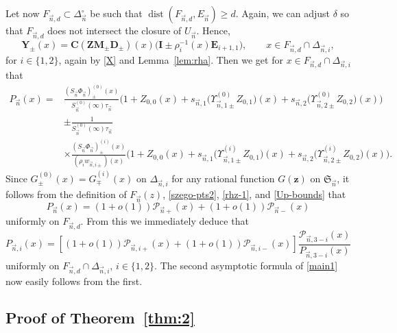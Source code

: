 \documentclass[pdftex]{sigma}
\numberwithin{equation}{section}
\newcommand{\dist}{\operatorname{dist}}
\newcommand{\n}{{\vec n}}
\newcommand{\RS}{\boldsymbol{\mathfrak{S}}}
\newcommand{\z}	{{\boldsymbol z}}
\begin{document}
Let now $ F_{\n,d} \subset\Delta_\n^\circ $ be such that $ \dist(F_{\n,d},E_\n)\geq d$. Again, we can adjust $ \delta $ so that $ F_{\n,d} $ does not intersect the closure of $ U_\n $. Hence,
\begin{equation}
\label{Y2}
\boldsymbol Y_{\pm}(x) = \boldsymbol C (\boldsymbol{ZM}_{\pm}\boldsymbol D_{\pm})(x)\bigl(\boldsymbol I \pm \rho_i^{-1}(x) \boldsymbol E_{i+1,1} \bigr), \qquad x\in F_{\n,d}\cap\Delta_{\n,i},
\end{equation}
for $ i\in\{1,2\} $, again by \eqref{X} and Lemma~\ref{lem:rha}. Then we get for $ x\in F_{\n,d} \cap \Delta_{\n,i} $ that
\begin{align*}
P_\n(x) = {}&\frac{(S_\n\Phi_\n)_\pm^{(0)}(x)}{S_\n^{(0)}(\infty) \tau_\n} \bigl(1+Z_{0,0}(x) + s_{\n,1} \bigl(\Upsilon_{\n,1\pm}^{(0)}Z_{0,1}\bigr)(x) + s_{\n,2}\bigl(\Upsilon_{\n,2\pm}^{(0)}Z_{0,2}\bigr)(x) \bigr) \\
 &\pm\frac1{S_\n^{(0)}(\infty) \tau_\n} \\
 &\times\frac{(S_\n\Phi_\n)_\pm^{(i)}(x)}{(\rho_iw_{\n,i\pm})(x)}\bigl(1+Z_{0,0}(x) + s_{\n,1} \bigl(\Upsilon_{\n,1\pm}^{(i)}Z_{0,1}\bigr)(x) + s_{\n,2}\bigl(\Upsilon_{\n,2\pm}^{(i)}Z_{0,2}\bigr)(x) \bigr).
\end{align*}
Since $ G^{(0)}_\pm(x) = G^{(i)}_\mp(x) $ on $ \Delta_{\n,i} $ for any rational function $ G(\z) $ on $ \RS_\n $, it follows from the definition of $ F_\n(z) $, \eqref{szego-pts2}, \eqref{rhz-1}, and \eqref{Up-bounds} that
\[
P_\n(x) = (1+ o(1)) \mathcal P_{\n+}(x) + (1+ o(1)) \mathcal P_{\n-}(x)
\]
uniformly on $ F_{\n,d} $. From this we immediately deduce that
\[
P_{\n,i}(x) = \left[ (1+ o(1)) \mathcal P_{\n,i+}(x) + (1+ o(1)) \mathcal P_{\n,i-}(x) \right] \frac{\mathcal P_{\n,3-i}(x)}{P_{\n,3-i}(x)}
\]
uniformly on $ F_{\n,d}\cap\Delta_{\n,i} $, $ i\in\{1,2\} $. The second asymptotic formula of \eqref{main1} now easily follows from the first.

\subsection[Proof of Theorem 1.6]{Proof of Theorem~\ref{thm:2}}
\end{document}
